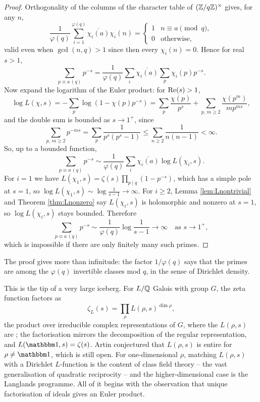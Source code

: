 \documentclass[a4paper]{scrartcl}
\begin{document}
\begin{proof}
	Orthogonality of the columns of the character table of $(\mathbb{Z}/q\mathbb{Z})^\times$ gives, for any $n$,
	$$\frac{1}{\varphi(q)}\sum_{i=1}^{\varphi(q)}\overline{\chi_i(a)}\chi_i(n) = \begin{cases}1 & n\equiv a \pmod q,\\ 0 & \text{otherwise},\end{cases}$$
	valid even when $\gcd(n,q)>1$ since then every $\chi_i(n) = 0$. Hence for real $s > 1$,
	$$\sum_{p \equiv a\, (q)}p^{-s} = \frac1{\varphi(q)}\sum_{i}\overline{\chi_i(a)}\sum_p\chi_i(p)p^{-s}.$$
	Now expand the logarithm of the Euler product: for $\operatorname{Re}(s)>1$,
	$$\log L(\chi,s) = -\sum_p\log\left(1-\chi(p)p^{-s}\right) = \sum_{p}\frac{\chi(p)}{p^s} + \sum_{p,\, m\ge2}\frac{\chi(p^m)}{mp^{ms}},$$
	and the double sum is bounded as $s \to 1^+$, since
	$$\sum_{p,\,m\ge2}p^{-ms} = \sum_p\frac{1}{p^s(p^s-1)} \le \sum_{n\ge2}\frac{1}{n(n-1)} < \infty.$$
	So, up to a bounded function,
	$$\sum_{p\equiv a\,(q)}p^{-s} \sim \frac1{\varphi(q)}\sum_i\overline{\chi_i(a)}\log L(\chi_i,s).$$
	For $i = 1$ we have $L(\chi_1,s) = \zeta(s)\prod_{p\mid q}(1-p^{-s})$, which has a simple pole at $s=1$, so $\log L(\chi_1,s)\sim\log\frac1{s-1}\to\infty$. For $i \geq 2$, Lemma \ref{lem:Lnontrivial} and Theorem \ref{thm:Lnonzero} say $L(\chi_i,s)$ is holomorphic and nonzero at $s = 1$, so $\log L(\chi_i,s)$ stays bounded. Therefore
	$$\sum_{p\equiv a\,(q)}p^{-s} \sim \frac{1}{\varphi(q)}\log\frac1{s-1} \longrightarrow \infty \quad\text{as } s\to1^+,$$
	which is impossible if there are only finitely many such primes.
\end{proof}

The proof gives more than infinitude: the factor $1/\varphi(q)$ says that the primes are  among the $\varphi(q)$ invertible classes mod $q$, in the sense of Dirichlet density.

\begin{remark}
	This is the tip of a very large iceberg. For $L/\mathbb{Q}$ Galois with group $G$, the zeta function factors as
	$$\zeta_L(s) = \prod_{\rho}L(\rho,s)^{\dim\rho},$$
	the product over irreducible complex representations of $G$, where the $L(\rho,s)$ are ; the factorisation mirrors the decomposition of the regular representation, and $L(\mathbbm 1, s) = \zeta(s)$. Artin conjectured that $L(\rho,s)$ is entire for $\rho \neq \mathbbm 1$, which is still open. For one-dimensional $\rho$, matching $L(\rho,s)$ with a Dirichlet $L$-function is the content of class field theory -- the vast generalisation of quadratic reciprocity -- and the higher-dimensional case is the Langlands programme. All of it begins with the observation that unique factorisation of ideals gives an Euler product.
\end{remark}
\end{document}
